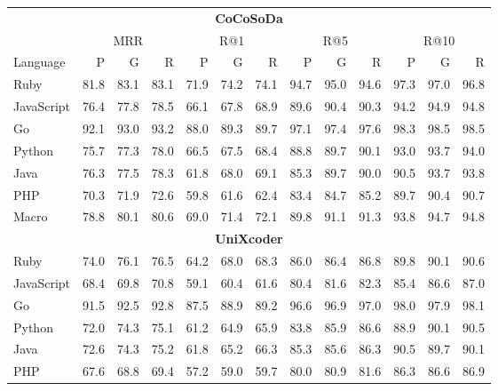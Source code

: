 \documentclass[11pt]{article}
\begin{document}
\begin{table}[!t]
  \centering
  \scriptsize
  \setlength{\tabcolsep}{1.5pt}
  \renewcommand{\arraystretch}{0.92}
  \begin{tabular*}{0.72\textwidth}{@{\extracolsep{\fill}}l*{12}{r}@{}}
    \toprule
    \multicolumn{13}{c}{\textbf{CoCoSoDa}} \\
    \cmidrule(lr){1-13}
    & \multicolumn{3}{c}{MRR} & \multicolumn{3}{c}{R@1} & \multicolumn{3}{c}{R@5} & \multicolumn{3}{c}{R@10} \\
    \cmidrule(lr){2-4}\cmidrule(lr){5-7}\cmidrule(lr){8-10}\cmidrule(lr){11-13}
    Language & P & G & R & P & G & R & P & G & R & P & G & R \\
    \midrule
    Ruby       & 81.8 & 83.1 & 83.1 & 71.9 & 74.2 & 74.1 & 94.7 & 95.0 & 94.6 & 97.3 & 97.0 & 96.8 \\
    JavaScript & 76.4 & 77.8 & 78.5 & 66.1 & 67.8 & 68.9 & 89.6 & 90.4 & 90.3 & 94.2 & 94.9 & 94.8 \\
    Go         & 92.1 & 93.0 & 93.2 & 88.0 & 89.3 & 89.7 & 97.1 & 97.4 & 97.6 & 98.3 & 98.5 & 98.5 \\
    Python     & 75.7 & 77.3 & 78.0 & 66.5 & 67.5 & 68.4 & 88.8 & 89.7 & 90.1 & 93.0 & 93.7 & 94.0 \\
    Java       & 76.3 & 77.5 & 78.3 & 61.8 & 68.0 & 69.1 & 85.3 & 89.7 & 90.0 & 90.5 & 93.7 & 93.8 \\
    PHP        & 70.3 & 71.9 & 72.6 & 59.8 & 61.6 & 62.4 & 83.4 & 84.7 & 85.2 & 89.7 & 90.4 & 90.7 \\
    Macro      & 78.8 & 80.1 & 80.6 & 69.0 & 71.4 & 72.1 & 89.8 & 91.1 & 91.3 & 93.8 & 94.7 & 94.8 \\
    \midrule
    \multicolumn{13}{c}{\textbf{UniXcoder}} \\
    \midrule
    Ruby       & 74.0 & 76.1 & 76.5 & 64.2 & 68.0 & 68.3 & 86.0 & 86.4 & 86.8 & 89.8 & 90.1 & 90.6 \\
    JavaScript & 68.4 & 69.8 & 70.8 & 59.1 & 60.4 & 61.6 & 80.4 & 81.6 & 82.3 & 85.4 & 86.6 & 87.0 \\
    Go         & 91.5 & 92.5 & 92.8 & 87.5 & 88.9 & 89.2 & 96.6 & 96.9 & 97.0 & 98.0 & 97.9 & 98.1 \\
    Python     & 72.0 & 74.3 & 75.1 & 61.2 & 64.9 & 65.9 & 83.8 & 85.9 & 86.6 & 88.9 & 90.1 & 90.5 \\
    Java       & 72.6 & 74.3 & 75.2 & 61.8 & 65.2 & 66.3 & 85.3 & 85.6 & 86.3 & 90.5 & 89.7 & 90.1 \\
    PHP        & 67.6 & 68.8 & 69.4 & 57.2 & 59.0 & 59.7 & 80.0 & 80.9 & 81.6 & 86.3 & 86.6 & 86.9 \\

\end{tabular*}
\end{table}
\end{document}
